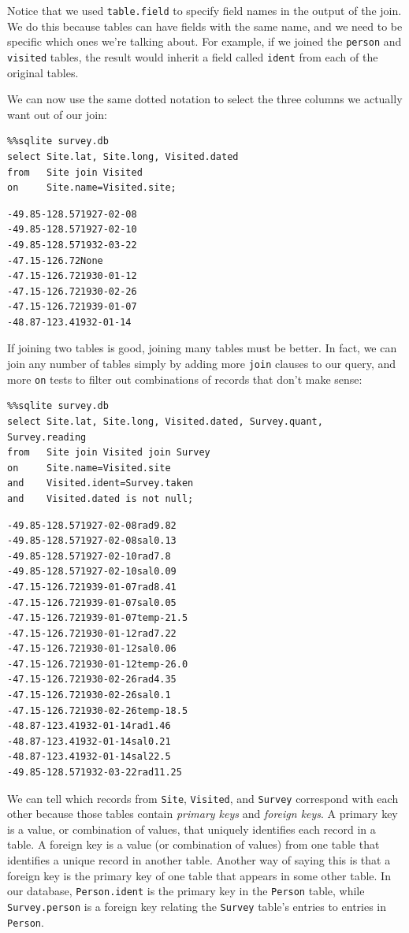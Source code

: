 \documentclass[]{book}
\newcommand{\gdef}[2]{\emph{#2}}
\begin{document}
Notice that we used \texttt{table.field} to specify field names in the
output of the join. We do this because tables can have fields with the
same name, and we need to be specific which ones we're talking about.
For example, if we joined the \texttt{person} and \texttt{visited}
tables, the result would inherit a field called \texttt{ident} from each
of the original tables.

We can now use the same dotted notation to select the three columns we
actually want out of our join:

\begin{verbatim}
%%sqlite survey.db
select Site.lat, Site.long, Visited.dated
from   Site join Visited
on     Site.name=Visited.site;
\end{verbatim}

\begin{verbatim}
-49.85-128.571927-02-08
-49.85-128.571927-02-10
-49.85-128.571932-03-22
-47.15-126.72None
-47.15-126.721930-01-12
-47.15-126.721930-02-26
-47.15-126.721939-01-07
-48.87-123.41932-01-14
\end{verbatim}

If joining two tables is good, joining many tables must be better. In
fact, we can join any number of tables simply by adding more
\texttt{join} clauses to our query, and more \texttt{on} tests to filter
out combinations of records that don't make sense:

\begin{verbatim}
%%sqlite survey.db
select Site.lat, Site.long, Visited.dated, Survey.quant, Survey.reading
from   Site join Visited join Survey
on     Site.name=Visited.site
and    Visited.ident=Survey.taken
and    Visited.dated is not null;
\end{verbatim}

\begin{verbatim}
-49.85-128.571927-02-08rad9.82
-49.85-128.571927-02-08sal0.13
-49.85-128.571927-02-10rad7.8
-49.85-128.571927-02-10sal0.09
-47.15-126.721939-01-07rad8.41
-47.15-126.721939-01-07sal0.05
-47.15-126.721939-01-07temp-21.5
-47.15-126.721930-01-12rad7.22
-47.15-126.721930-01-12sal0.06
-47.15-126.721930-01-12temp-26.0
-47.15-126.721930-02-26rad4.35
-47.15-126.721930-02-26sal0.1
-47.15-126.721930-02-26temp-18.5
-48.87-123.41932-01-14rad1.46
-48.87-123.41932-01-14sal0.21
-48.87-123.41932-01-14sal22.5
-49.85-128.571932-03-22rad11.25
\end{verbatim}

We can tell which records from \texttt{Site}, \texttt{Visited}, and
\texttt{Survey} correspond with each other because those tables contain
\gdef{g:primary-key}{primary keys} and
\gdef{g:foreign-key}{foreign keys}. A primary key is a value, or
combination of values, that uniquely identifies each record in a table.
A foreign key is a value (or combination of values) from one table that
identifies a unique record in another table. Another way of saying this
is that a foreign key is the primary key of one table that appears in
some other table. In our database, \texttt{Person.ident} is the primary
key in the \texttt{Person} table, while \texttt{Survey.person} is a
foreign key relating the \texttt{Survey} table's entries to entries in
\texttt{Person}.
\end{document}
